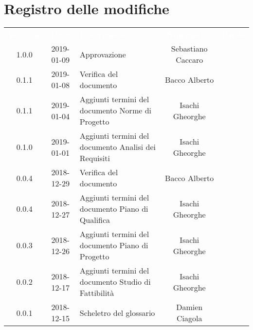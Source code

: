 
\section*{Registro delle modifiche}
{
	\renewcommand{\arraystretch}{1.5}
	\centering
	\begin{longtable}{ c c  C{4cm}  c  c }
		
		\textcolor{white}{\textbf{Versione}} & \textcolor{white}{\textbf{Data}} & \textcolor{white}{\textbf{Descrizione}} & \textcolor{white}{\textbf{Nominativo}} & \textcolor{white}{\textbf{Ruolo}}\\
		
		1.0.0 & 2019-01-09 & Approvazione & Sebastiano Caccaro & \Res{}\\
						
		0.1.1 & 2019-01-08 & Verifica del documento & Bacco Alberto & \ver{}\\
		
		0.1.1 & 2019-01-04 & Aggiunti termini del documento Norme di Progetto & Isachi Gheorghe &\reda{}\\
		
		0.1.0 & 2019-01-01 & Aggiunti termini del documento Analisi dei Requisiti & Isachi Gheorghe &\reda{}\\
		
		0.0.4 & 2018-12-29 & Verifica del documento & Bacco Alberto & \ver{}\\
				
		0.0.4 & 2018-12-27 & Aggiunti termini del documento Piano di Qualifica & Isachi Gheorghe &\reda{}\\
				
		0.0.3 & 2018-12-26 &Aggiunti termini del documento Piano di Progetto & Isachi Gheorghe & \reda{}\\
				
		0.0.2 & 2018-12-17 & Aggiunti termini del documento Studio di Fattibilità & Isachi Gheorghe &\reda{}\\
		
		0.0.1 & 2018-12-15 & Scheletro del glossario & Damien Ciagola & \reda{}\\
		
	\end{longtable}

}